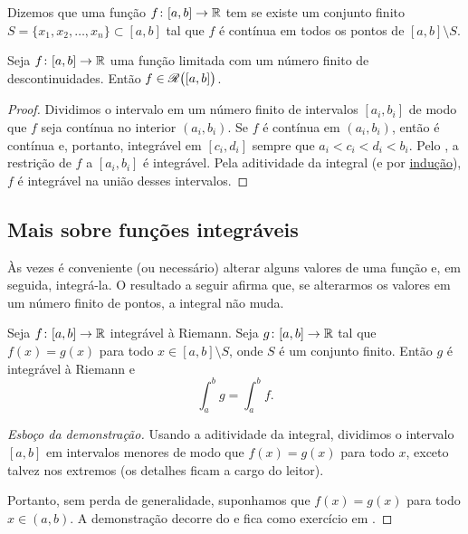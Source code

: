 Dizemos que uma função $f \colon [a,b] \to {\mathbb{R}}$ tem \emph{} se existe um conjunto finito
$S = \{ x_1, x_2, \ldots, x_n \} \subset [a,b]$ tal que $f$ é contínua
em todos os pontos de $[a,b] \setminus S$.

\begin{thm}
Seja $f \colon [a,b] \to {\mathbb{R}}$ uma função limitada com um número finito
de descontinuidades. Então $f \in {\mathscr{R}}\bigl([a,b]\bigr)$.
\end{thm}

\begin{proof}
Dividimos o intervalo em um número finito de intervalos $[a_i,b_i]$
de modo que $f$ seja contínua no interior $(a_i,b_i)$. Se $f$ é contínua
em $(a_i,b_i)$, então é contínua e, portanto, integrável em $[c_i,d_i]$
sempre que $a_i < c_i < d_i < b_i$. Pelo ,
a restrição de $f$ a $[a_i,b_i]$ é integrável.
Pela aditividade da integral (e por \hyperref[induction:thm]{indução}),
$f$ é integrável na união desses intervalos.
\end{proof}

\subsection{Mais sobre funções integráveis}

Às vezes é conveniente (ou necessário)
alterar alguns valores de uma função e, em seguida, integrá-la. O resultado
a seguir afirma que, se alterarmos os valores em um número finito de pontos,
a integral não muda.

\begin{prop}
Seja $f \colon [a,b] \to {\mathbb{R}}$ integrável à Riemann. Seja
$g \colon [a,b] \to {\mathbb{R}}$ tal que $f(x) = g(x)$ para todo
$x \in [a,b] \setminus S$, onde $S$ é um conjunto finito.
Então $g$ é integrável à Riemann e
\begin{equation*}
\int_a^b g = \int_a^b f.
\end{equation*}
\end{prop}

\begin{proof}[Esboço da demonstração]
Usando a aditividade da integral, dividimos o intervalo $[a,b]$ em
intervalos menores de modo que $f(x) = g(x)$ para todo $x$, exceto talvez
nos extremos (os detalhes ficam a cargo do leitor).

Portanto, sem perda de generalidade, suponhamos que $f(x) = g(x)$ para
todo $x \in (a,b)$. A demonstração decorre do
 e fica como exercício em
.
\end{proof}

